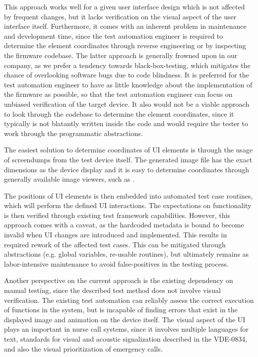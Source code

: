 \documentclass[Proposal,BIC,english,fhCitStyle,IEEE]{BASE/twbook} %
\begin{document}
This approach works well for a given user interface design which is not affected by frequent changes, but it lacks verification on the visual aspect of the user interface itself. Furthermore, it comes with an inherent problem in maintenance and development time, since the test automation engineer is required to determine the element coordinates through reverse engineering or by inspecting the firmware codebase.
The latter approach is generally frowned upon in our company, as we prefer a tendency towards black-box-testing, which mitigates the chance of overlooking software bugs due to code blindness. It is preferred for the test automation engineer to have as little knowledge about the implementation of the firmware as possible, so that the test automation engineer can focus on unbiased verification of the target device.
It also would not be a viable approach to look through the codebase to determine the element coordinates, since it typically is not blatantly written inside the code and would require the tester to work through the programmatic abstractions.

The easiest solution to determine coordinates of UI elements is through the usage of screendumps from the test device itself. The generated image file has the exact dimensions as the device display and it is easy to determine coordinates through generally available image viewers, such as .

The positions of UI elements is then embedded into automated test case routines, which will perform the defined UI interactions.
The expectations on functionality is then verified through existing test framework capabilities.
However, this approach comes with a caveat, as the hardcoded metadata is bound to become invalid when UI changes are introduced and implemented. This results in required rework of the affected test cases. This can be mitigated through abstractions (e.g. global variables, re-usable routines), but ultimately remains as labor-intensive maintenance to avoid false-positives in the testing process.

Another perspective on the current approach is the existing dependency on manual testing, since the described test method does not involve visual verification. The existing test automation can reliably assess the correct execution of functions in the system, but is incapable of finding errors that exist in the displayed image and animation on the device itself.
The visual aspect of the UI plays an important in nurse call systems, since it involves multiple languages for text, standards for visual and acoustic signalization described in the VDE-0834, and also the visual prioritization of emergency calls.
\end{document}
